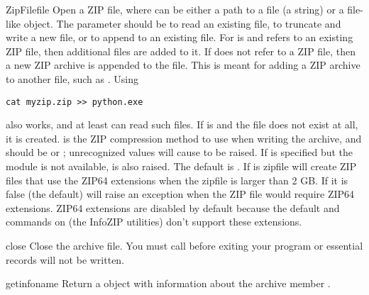 \begin{classdesc}{ZipFile}{file} 
  Open a ZIP file, where  can be either a path to a file
  (a string) or a file-like object.  The  parameter
  should be  to read an existing file,  to
  truncate and write a new file, or  to append to an
  existing file.  For  is  and 
  refers to an existing ZIP file, then additional files are added to
  it.  If  does not refer to a ZIP file, then a new ZIP
  archive is appended to the file.  This is meant for adding a ZIP
  archive to another file, such as .  Using

\begin{verbatim}
cat myzip.zip >> python.exe
\end{verbatim}

  also works, and at least  can read such files.
  If  is  and the file does not exist at all,
  it is created.
   is the ZIP compression method to use when writing
  the archive, and should be  or
  ; unrecognized values will cause
   to be raised.  If 
  is specified but the  module is not available,
   is also raised.  The default is
  . 
  If  is  zipfile will create ZIP files that use
  the ZIP64 extensions when the zipfile is larger than 2 GB. If it is 
  false (the default)  will raise an exception when the
  ZIP file would require ZIP64 extensions. ZIP64 extensions are disabled by
  default because the default  and  commands on
  \UNIX{} (the InfoZIP utilities) don't support these extensions.

\end{classdesc}

\begin{methoddesc}{close}{}
  Close the archive file.  You must call  before
  exiting your program or essential records will not be written. 
\end{methoddesc}

\begin{methoddesc}{getinfo}{name}
  Return a  object with information about the archive
  member .
\end{methoddesc}

